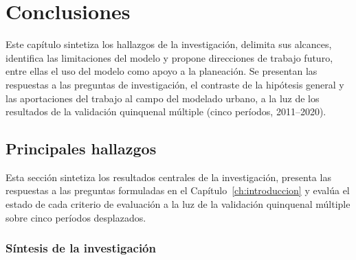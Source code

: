 
\chapter{Conclusiones}
\label{ch:conclusiones}

\begin{resumen}
Este capítulo sintetiza los hallazgos de la investigación, delimita sus alcances, identifica las limitaciones del modelo y propone direcciones de trabajo futuro, entre ellas el uso del modelo como apoyo a la planeación. Se presentan las respuestas a las preguntas de investigación, el contraste de la hipótesis general y las aportaciones del trabajo al campo del modelado urbano, a la luz de los resultados de la validación quinquenal múltiple (cinco períodos, 2011--2020).
\end{resumen}

\section{Principales hallazgos}

Esta sección sintetiza los resultados centrales de la investigación, presenta las respuestas a las preguntas formuladas en el Capítulo~\ref{ch:introduccion} y evalúa el estado de cada criterio de evaluación a la luz de la validación quinquenal múltiple sobre cinco períodos desplazados.

\subsection{Síntesis de la investigación}

